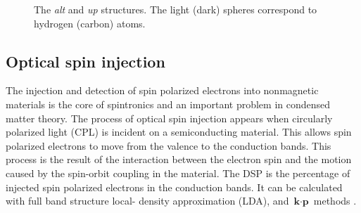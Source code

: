 \documentclass[pss]{wiley2sp} %
\begin{document}
\begin{figure}[t]
\hfill
{}
\caption{The \emph{alt} and \emph{up} structures. The light
(dark) spheres correspond to hydrogen (carbon) atoms.\label{fig:structures}}
\end{figure}

\subsection{Optical spin injection}

The injection and detection of spin polarized electrons into nonmagnetic
materials is the core of spintronics \cite{vzutic2004spintronics,%
fert2008nobel,pezzoli2012optical,bottegoni2013experimental,%
bottegoni2013photoinduced} and an important problem in condensed matter
theory. The process of optical spin injection appears when circularly
polarized light (CPL) \cite{dyakonov1984theory} is incident on a
semiconducting material. This allows spin polarized electrons to move from the
valence to the conduction bands. This process is the result of the interaction
between the electron spin and the motion caused by the spin-orbit coupling in
the material. The DSP is the percentage of injected spin polarized electrons
in the conduction bands. It can be calculated with full band structure local-
density approximation (LDA), and $\textbf{k}\cdot\textbf{p}$ methods
\cite{nastos2007full,cabellos2009stress}.
\end{document}
